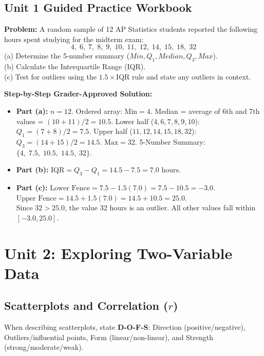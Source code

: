 ﻿\documentclass[11pt,oneside,openany]{book}
\begin{document}
\section{Unit 1 Guided Practice Workbook}
\begin{workbookbox}
\textbf{Problem:} A random sample of 12 AP Statistics students reported the following hours spent studying for the midterm exam:
\[ 4, \; 6, \; 7, \; 8, \; 9, \; 10, \; 11, \; 12, \; 14, \; 15, \; 18, \; 32 \]
(a) Determine the 5-number summary ($Min, Q_1, Median, Q_3, Max$).\\
(b) Calculate the Interquartile Range (IQR).\\
(c) Test for outliers using the $1.5 \times \text{IQR}$ rule and state any outliers in context.

\textbf{Step-by-Step Grader-Approved Solution:}
\begin{itemize}[leftmargin=1.2em]
  \item \textbf{Part (a):} $n = 12$. Ordered array:
  $\text{Min} = 4$. Median = average of 6th and 7th values = $(10 + 11)/2 = 10.5$.
  Lower half ($4, 6, 7, 8, 9, 10$): $Q_1 = (7 + 8)/2 = 7.5$.
  Upper half ($11, 12, 14, 15, 18, 32$): $Q_3 = (14 + 15)/2 = 14.5$.
  $\text{Max} = 32$.
  5-Number Summary: $\{4, \; 7.5, \; 10.5, \; 14.5, \; 32\}$.
  \item \textbf{Part (b):} $\text{IQR} = Q_3 - Q_1 = 14.5 - 7.5 = 7.0\text{ hours}$.
  \item \textbf{Part (c):}
  $\text{Lower Fence} = 7.5 - 1.5(7.0) = 7.5 - 10.5 = -3.0$.\\
  $\text{Upper Fence} = 14.5 + 1.5(7.0) = 14.5 + 10.5 = 25.0$.\\
  Since $32 > 25.0$, the value 32 hours is an outlier. All other values fall within $[-3.0, 25.0]$.
\end{itemize}
\end{workbookbox}

\chapter{Unit 2: Exploring Two-Variable Data}

\section{Scatterplots and Correlation ($r$)}
When describing scatterplots, state \textbf{D-O-F-S}: Direction (positive/negative), Outliers/influential points, Form (linear/non-linear), and Strength (strong/moderate/weak).
\end{document}
